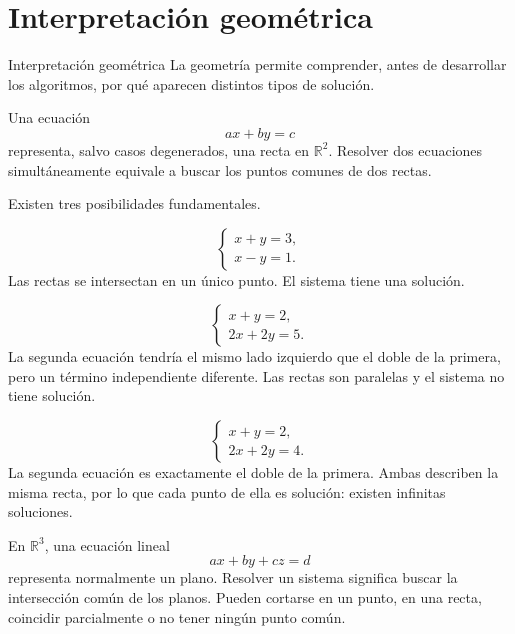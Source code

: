 \documentclass[aspectratio=169,9pt]{beamer}
\theoremstyle{remark}
\newcommand{\R}{\mathbb{R}}
\begin{document}
\section{Interpretación geométrica}
\begin{frame}[allowframebreaks,t]{Interpretación geométrica}
La geometría permite comprender, antes de desarrollar los algoritmos, por qué aparecen distintos tipos
de solución.

\par{}\par\smallskip

Una ecuación
\[
ax+by=c
\]
representa, salvo casos degenerados, una recta en $\R^2$. Resolver dos ecuaciones simultáneamente
equivale a buscar los puntos comunes de dos rectas.

Existen tres posibilidades fundamentales.

\par{}\par
\[
\begin{cases}
x+y=3,\\
x-y=1.
\end{cases}
\]
Las rectas se intersectan en un único punto. El sistema tiene una solución.

\par{}\par
\[
\begin{cases}
x+y=2,\\
2x+2y=5.
\end{cases}
\]
La segunda ecuación tendría el mismo lado izquierdo que el doble de la primera, pero un término
independiente diferente. Las rectas son paralelas y el sistema no tiene solución.

\par{}\par
\[
\begin{cases}
x+y=2,\\
2x+2y=4.
\end{cases}
\]
La segunda ecuación es exactamente el doble de la primera. Ambas describen la misma recta, por lo que
cada punto de ella es solución: existen infinitas soluciones.

\par{}\par\smallskip

En $\R^3$, una ecuación lineal
\[
ax+by+cz=d
\]
representa normalmente un plano. Resolver un sistema significa buscar la intersección común de los
planos. Pueden cortarse en un punto, en una recta, coincidir parcialmente o no tener ningún punto común.


\end{frame}
\end{document}
